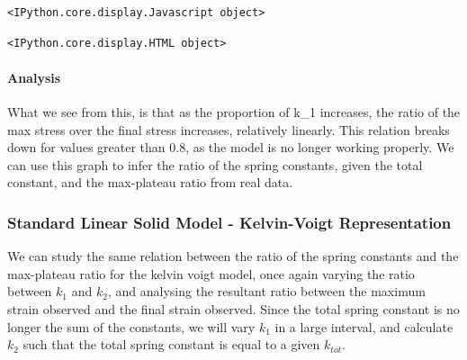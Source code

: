 \documentclass[11pt]{article}
\begin{document}
    
    \begin{verbatim}
<IPython.core.display.Javascript object>
    \end{verbatim}

    
    
    \begin{verbatim}
<IPython.core.display.HTML object>
    \end{verbatim}

    
    \paragraph{Analysis}\label{analysis}

What we see from this, is that as the proportion of k\_1 increases, the
ratio of the max stress over the final stress increases, relatively
linearly. This relation breaks down for values greater than 0.8, as the
model is no longer working properly. We can use this graph to infer the
ratio of the spring constants, given the total constant, and the
max-plateau ratio from real data.

    \subsubsection{Standard Linear Solid Model - Kelvin-Voigt
Representation}\label{standard-linear-solid-model---kelvin-voigt-representation}

We can study the same relation between the ratio of the spring constants
and the max-plateau ratio for the kelvin voigt model, once again varying
the ratio between $k_1$ and $k_2$, and analysing the resultant ratio
between the maximum strain observed and the final strain observed. Since
the total spring constant is no longer the sum of the constants, we will
vary $k_1$ in a large interval, and calculate $k_2$ such that the
total spring constant is equal to a given $k_{tot}$.
\end{document}
